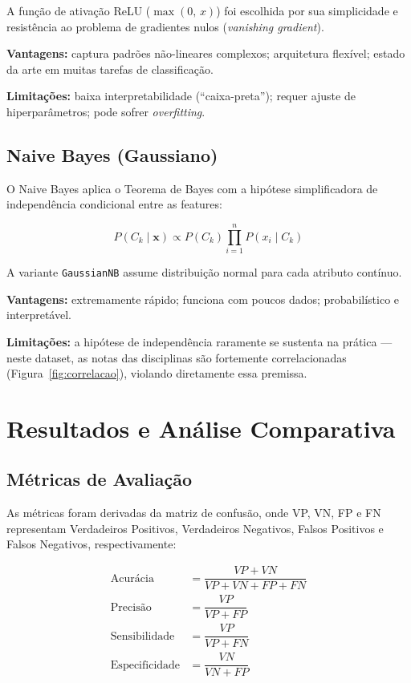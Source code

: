 \documentclass[12pt, a4paper]{article}
\begin{document}
A função de ativação ReLU ($\max(0,\,x)$) foi escolhida por sua simplicidade
e resistência ao problema de gradientes nulos (\textit{vanishing gradient}).

\noindent\textbf{Vantagens:} captura padrões não-lineares complexos;
arquitetura flexível; estado da arte em muitas tarefas de classificação.

\noindent\textbf{Limitações:} baixa interpretabilidade (``caixa-preta'');
requer ajuste de hiperparâmetros; pode sofrer \textit{overfitting}.

\subsection{Naive Bayes (Gaussiano)}

O Naive Bayes aplica o Teorema de Bayes com a hipótese simplificadora de
independência condicional entre as features:

\[
  P(C_k \mid \mathbf{x}) \propto P(C_k)
  \prod_{i=1}^{n} P(x_i \mid C_k)
\]

A variante \texttt{GaussianNB} assume distribuição normal para cada atributo
contínuo.

\noindent\textbf{Vantagens:} extremamente rápido; funciona com poucos dados;
probabilístico e interpretável.

\noindent\textbf{Limitações:} a hipótese de independência raramente se
sustenta na prática --- neste dataset, as notas das disciplinas são
fortemente correlacionadas (Figura~\ref{fig:correlacao}), violando
diretamente essa premissa.

\section{Resultados e Análise Comparativa}
\label{sec:resultados}

\subsection{Métricas de Avaliação}

As métricas foram derivadas da matriz de confusão, onde VP, VN, FP e FN
representam Verdadeiros Positivos, Verdadeiros Negativos, Falsos Positivos
e Falsos Negativos, respectivamente:

\begin{align*}
  \text{Acurácia}       &= \dfrac{VP + VN}{VP + VN + FP + FN} \\[6pt]
  \text{Precisão}       &= \dfrac{VP}{VP + FP} \\[6pt]
  \text{Sensibilidade}  &= \dfrac{VP}{VP + FN} \\[6pt]
  \text{Especificidade} &= \dfrac{VN}{VN + FP}
\end{align*}
\end{document}
